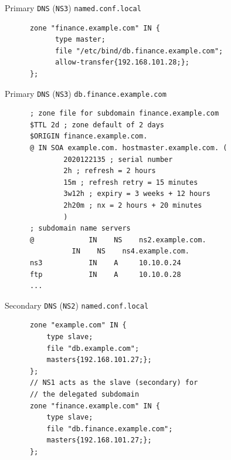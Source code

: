 \documentclass[xcolor=table,aspectratio=169]{beamer}
\begin{document}
\begin{frame}[fragile]{Primary \texttt{DNS} (\texttt{NS3}) \texttt{named.conf.local}}
  \begin{tcolorbox}
    \lstset{
      basicstyle=\tiny\ttfamily,
    }
    \begin{lstlisting}
      zone "finance.example.com" IN {
	        type master;
	        file "/etc/bind/db.finance.example.com";
	        allow-transfer{192.168.101.28;};
      };
    \end{lstlisting}
  \end{tcolorbox}
\end{frame}

\begin{frame}[fragile]{Primary \texttt{DNS} (\texttt{NS3}) \texttt{db.finance.example.com}}
  \begin{tcolorbox}
    \lstset{
      basicstyle=\tiny\ttfamily,
    }
    \begin{lstlisting}
      ; zone file for subdomain finance.example.com
      $TTL 2d ; zone default of 2 days
      $ORIGIN finance.example.com.
      @	IN SOA example.com. hostmaster.example.com. (
              2020122135 ; serial number
              2h ; refresh = 2 hours
              15m ; refresh retry = 15 minutes
              3w12h ; expiry = 3 weeks + 12 hours
              2h20m ; nx = 2 hours + 20 minutes
              )
      ; subdomain name servers
      @			    IN    NS    ns2.example.com.
                IN    NS    ns4.example.com.
      ns3 			IN    A     10.10.0.24
      ftp 			IN    A     10.10.0.28
      ...   
    \end{lstlisting}
  \end{tcolorbox}
\end{frame}

\begin{frame}[fragile]{Secondary \texttt{DNS} (\texttt{NS2}) \texttt{named.conf.local}}
  \begin{tcolorbox}
    \lstset{
      basicstyle=\tiny\ttfamily,
    }
    \begin{lstlisting}
      zone "example.com" IN {
	      type slave;
	      file "db.example.com";
	      masters{192.168.101.27;};
      };
      // NS1 acts as the slave (secondary) for 
      // the delegated subdomain
      zone "finance.example.com" IN {
	      type slave;
	      file "db.finance.example.com";
	      masters{192.168.101.27;};
      };
    \end{lstlisting}
  \end{tcolorbox}
\end{frame}
\end{document}
